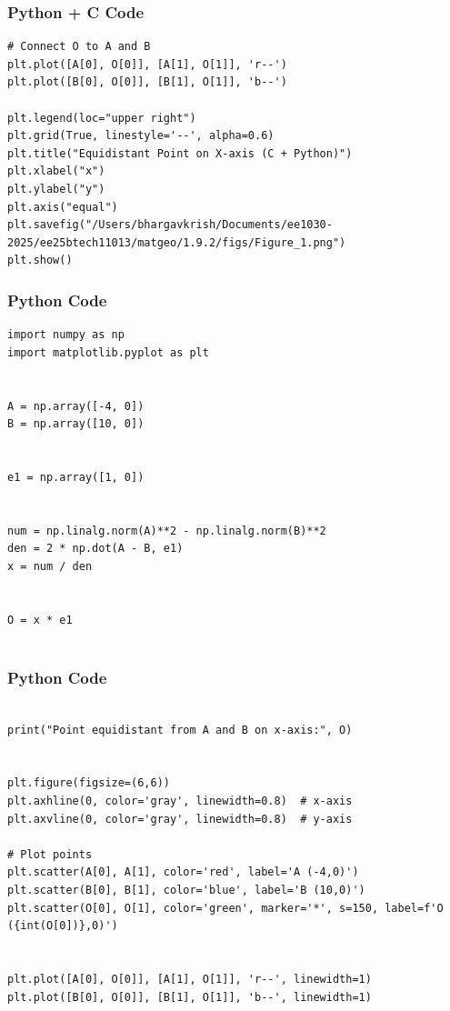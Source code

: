 \documentclass{beamer}
\begin{document}
\begin{frame}[fragile]
    \frametitle{Python + C Code}
    \begin{lstlisting}
# Connect O to A and B
plt.plot([A[0], O[0]], [A[1], O[1]], 'r--')
plt.plot([B[0], O[0]], [B[1], O[1]], 'b--')

plt.legend(loc="upper right")
plt.grid(True, linestyle='--', alpha=0.6)
plt.title("Equidistant Point on X-axis (C + Python)")
plt.xlabel("x")
plt.ylabel("y")
plt.axis("equal")
plt.savefig("/Users/bhargavkrish/Documents/ee1030-2025/ee25btech11013/matgeo/1.9.2/figs/Figure_1.png")
plt.show()

    \end{lstlisting}
\end{frame}



\begin{frame}[fragile]
    \frametitle{Python Code}
    \begin{lstlisting}
import numpy as np
import matplotlib.pyplot as plt


A = np.array([-4, 0])
B = np.array([10, 0])


e1 = np.array([1, 0])


num = np.linalg.norm(A)**2 - np.linalg.norm(B)**2
den = 2 * np.dot(A - B, e1)
x = num / den


O = x * e1


    \end{lstlisting}
\end{frame}

\begin{frame}[fragile]
    \frametitle{Python Code}
    \begin{lstlisting}

print("Point equidistant from A and B on x-axis:", O)


plt.figure(figsize=(6,6))
plt.axhline(0, color='gray', linewidth=0.8)  # x-axis
plt.axvline(0, color='gray', linewidth=0.8)  # y-axis

# Plot points
plt.scatter(A[0], A[1], color='red', label='A (-4,0)')
plt.scatter(B[0], B[1], color='blue', label='B (10,0)')
plt.scatter(O[0], O[1], color='green', marker='*', s=150, label=f'O ({int(O[0])},0)')


plt.plot([A[0], O[0]], [A[1], O[1]], 'r--', linewidth=1)
plt.plot([B[0], O[0]], [B[1], O[1]], 'b--', linewidth=1)




    \end{lstlisting}
\end{frame}
\end{document}
